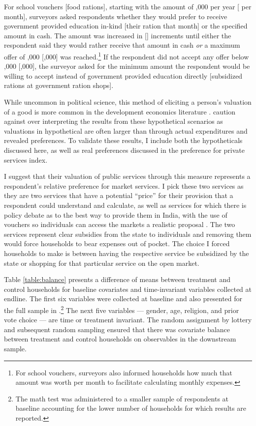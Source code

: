 \documentclass[hidelinks, 12pt, titlepage]{article}
\begin{document}
		For school vouchers [food rations], starting with the amount of ,000 per year [ per month], surveyors asked respondents whether they would prefer to receive government provided education in-kind [their ration that month] or the specified amount in cash.  The amount was increased in  [] increments until either the respondent said they would rather receive that amount in cash \emph{or} a maximum offer of ,000 [,000] was reached.\footnote{For school vouchers, surveyors also informed households how much that amount was worth per month to facilitate calculating monthly expenses.}  If the respondent did not accept any offer below ,000 [,000], the surveyor asked for the minimum amount the respondent would be willing to accept instead of government provided education directly [subsidized rations at government ration shops].

		While uncommon in political science, this method of eliciting a person's valuation of a good is more common in the development economics literature \citep{Kremer2011}.  \cite{Kremer2011} caution against over interpreting the results from these hypothetical scenarios as valuations in hypothetical are often larger than through actual expenditures and revealed preferences.  To validate these results, I include both the hypotheticals discussed here, as well as real preferences discussed in the preference for private services index.

		I suggest that their valuation of public services through this measure represents a respondent's relative preference for market services.  I pick these two services as they are two services that have a potential ``price'' for their provision that a respondent could understand and calculate, as well as services for which there is policy debate as to the best way to provide them in India, with the use of vouchers so individuals can access the markets a realistic proposal \citep{Kapur2008}.  The two services represent clear subsidies from the state to individuals and removing them would force households to bear expenses out of pocket.  The choice I forced households to make is between having the respective service be subsidized by the state or shopping for that particular service on the open market.

	Table \ref{table:balance} presents a difference of means between treatment and control households for baseline covariates and time-invariant variables collected at endline.  The first six variables were collected at baseline and also presented for the full sample in \cite{Muralidharan2015}.\footnote{The math test was administered to a smaller sample of respondents at baseline accounting for the lower number of households for which results are reported.}  The next five variables --- gender, age, religion, and prior vote choice --- are time or treatment invariant.  The random assignment by lottery and subsequent random sampling ensured that there was covariate balance between treatment and control households on observables in the downstream sample.
\end{document}
